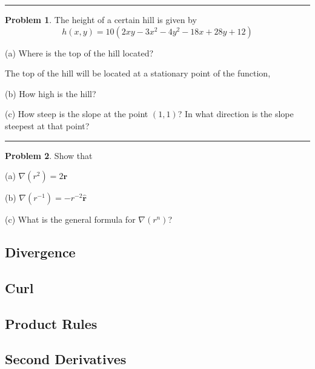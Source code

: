 \documentclass{article}
\theoremstyle{definition}
\newtheorem{problem}{Problem}[section]
\theoremstyle{remark}
\newcommand{\pline}{\par\noindent\rule{\textwidth}{0.5pt}}
\renewcommand{\vec}{\mathbf}
\newcommand{\rhat}{\hat{\vec{r}}}
\newcommand{\grad}{\nabla}
\begin{document}
\pline
\begin{problem}
The height of a certain hill is given by \[h(x,y) = 10(2xy-3x^2-4y^2-18x+28y+12)\]
\end{problem}
\begin{description}
\item{(a)} Where is the top of the hill located?

The top of the hill will be located at a stationary point of the function, 
\item{(b)} How high is the hill?
\item{(c)} How steep is the slope at the point $(1,1)$? In what direction is the slope steepest at that point?
\end{description}
\pline

\begin{problem}
Show that
\end{problem}
\begin{description}
\item{(a)} $\grad (r^2) = 2\vec{r}$
\item{(b)} $\grad (r^{-1}) = -r^{-2}\rhat$
\item{(c)} What is the general formula for $\grad (r^n)$?
\end{description}










\subsection{Divergence}

\subsection{Curl}

\subsection{Product Rules}

\subsection{Second Derivatives}
\end{document}
